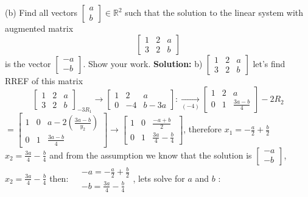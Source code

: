 \documentclass{article}
\begin{document}
\begin{enumerate}
(b) Find all vectors $\left[\begin{array}{l}a \\ b\end{array}\right] \in \mathbb{R}^2$ such that the solution to the linear system with augmented matrix
$$
\left[\begin{array}{ll|l}
1 & 2 & a \\
3 & 2 & b
\end{array}\right]
$$
is the vector $\left[\begin{array}{l}-a \\ -b\end{array}\right]$. Show your work.
\textbf{Solution:}
b) $\left[\begin{array}{ll|l}1 & 2 & a \\ 3 & 2 & b\end{array}\right]$ let's find RREF of this matrix
$$
\left[\begin{array}{ll|l}
1 & 2 & a \\
3 & 2 & b
\end{array}\right]_{-3 R_1} \rightarrow\left[\begin{array}{cc|c}
1 & 2 & a \\
0 & -4 & b-3 a
\end{array}\right]: \underset{(-4)}{\rightarrow}\left[\begin{array}{cc|c}
1 & 2 & a \\
0 & 1 & \frac{3 a-b}{4}
\end{array}\right]-2 R_2
$$
$=\left[\begin{array}{cc|c}1 & 0 & a-2\left(\frac{3 a-b}{y_2}\right) \\ 0 & 1 & \frac{3 a-b}{4}\end{array}\right] \rightarrow\left[\begin{array}{ll|l}1 & 0 & \frac{-a+b}{2} \\ 0 & 1 & \frac{3 a}{4}-\frac{b}{4}\end{array}\right]$, therefore $x_1=-\frac{a}{2}+\frac{b}{2}$ $x_2=\frac{3 a}{4}-\frac{b}{4}$ and from the assumption we know that the solution is $\left[\begin{array}{l}-a \\ -b\end{array}\right]$, $x_2=\frac{3 a}{4}-\frac{b}{4}$
then: $\begin{aligned} & -a=-\frac{a}{2}+\frac{b}{2} \\ & -b=\frac{3 a}{4}-\frac{b}{4}\end{aligned}$, lets solve for $a$ and $b$ :

\end{enumerate}
\end{document}

